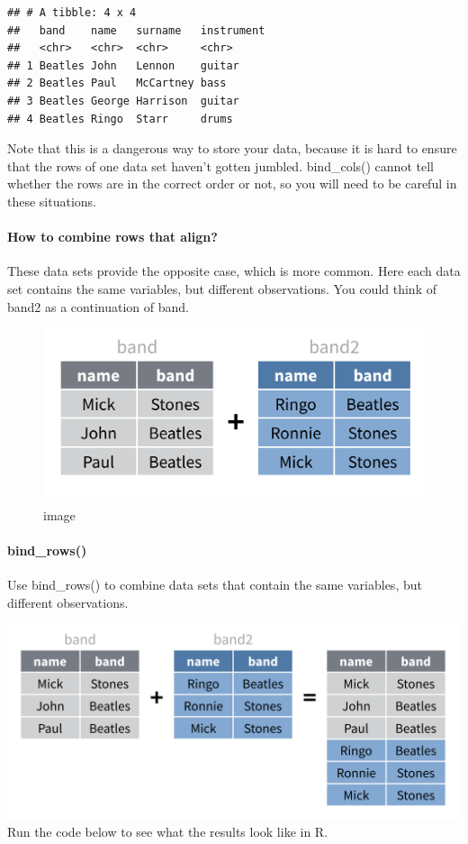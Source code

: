 \documentclass[
]{article}
\begin{document}
\begin{verbatim}
## # A tibble: 4 x 4
##   band    name   surname   instrument
##   <chr>   <chr>  <chr>     <chr>     
## 1 Beatles John   Lennon    guitar    
## 2 Beatles Paul   McCartney bass      
## 3 Beatles George Harrison  guitar    
## 4 Beatles Ringo  Starr     drums
\end{verbatim}

Note that this is a dangerous way to store your data, because it is hard
to ensure that the rows of one data set haven't gotten jumbled.
bind\_cols() cannot tell whether the rows are in the correct order or
not, so you will need to be careful in these situations.

\hypertarget{how-to-combine-rows-that-align}{%
\paragraph{How to combine rows that
align?}\label{how-to-combine-rows-that-align}}

These data sets provide the opposite case, which is more common. Here
each data set contains the same variables, but different observations.
You could think of band2 as a continuation of band.

\begin{figure}
\centering
\includegraphics{data/band2.png}
\caption{image}
\end{figure}

\hypertarget{bind_rows}{%
\paragraph{bind\_rows()}\label{bind_rows}}

Use bind\_rows() to combine data sets that contain the same variables,
but different observations.

\includegraphics{data/bind-rows.png} Run the code below to see what the
results look like in R.
\end{document}
